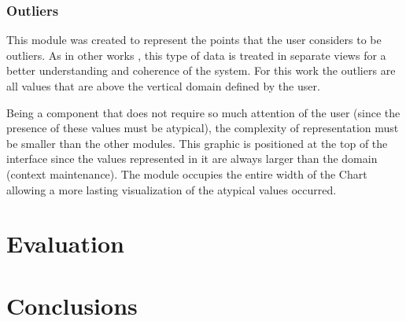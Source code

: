 \documentclass[letterpaper, 10 pt, conference]{ieeeconf}  %
\begin{document}
\subsubsection{Outliers}
\label{subsubsection:outliers}
This module was created to represent the points that the user considers to be outliers. As in other works \cite{4015444}, this type of data is treated in separate views for a better understanding and coherence of the system. For this work the outliers are all values that are above the vertical domain defined by the user.

Being a component that does not require so much attention of the user (since the presence of these values must be atypical), the complexity of representation must be smaller than the other modules. This graphic is positioned at the top of the interface since the values represented in it are always larger than the domain (context maintenance).
The module occupies the entire width of the Chart allowing a more lasting visualization of the atypical values occurred.

\section{Evaluation}
\label{section:evaluation}

\section{Conclusions}
\label{section:conclusions}



\addtolength{\textheight}{-12cm}   %















\end{document}
